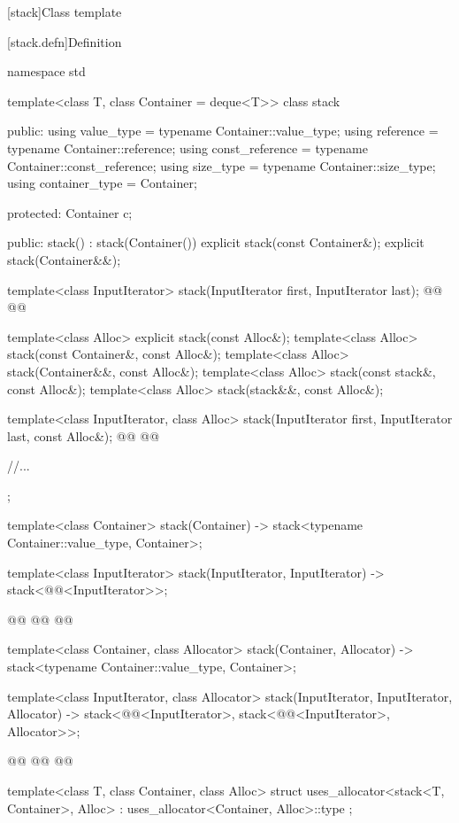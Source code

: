 \documentclass{wg21}
\begin{document}
[stack]{Class template }

[stack.defn]{Definition}

\begin{codeblock}
namespace std {
    template<class T, class Container = deque<T>>
    class stack {
        public:
        using value_type      = typename Container::value_type;
        using reference       = typename Container::reference;
        using const_reference = typename Container::const_reference;
        using size_type       = typename Container::size_type;
        using container_type  = Container;

        protected:
        Container c;

        public:
        stack() : stack(Container()) {}
        explicit stack(const Container&);
        explicit stack(Container&&);

        template<class InputIterator>
        stack(InputIterator first, InputIterator last);
        @@
        @@

        template<class Alloc> explicit stack(const Alloc&);
        template<class Alloc> stack(const Container&, const Alloc&);
        template<class Alloc> stack(Container&&, const Alloc&);
        template<class Alloc> stack(const stack&, const Alloc&);
        template<class Alloc> stack(stack&&, const Alloc&);


        template<class InputIterator, class Alloc>
        stack(InputIterator first, InputIterator last, const Alloc&);
        @@
        @@

        //...
    };

    template<class Container>
    stack(Container) -> stack<typename Container::value_type, Container>;

    template<class InputIterator>
    stack(InputIterator, InputIterator)
    -> stack<@@<InputIterator>>;

    @@
    @@
    @@

    template<class Container, class Allocator>
    stack(Container, Allocator) -> stack<typename Container::value_type, Container>;

    template<class InputIterator, class Allocator>
    stack(InputIterator, InputIterator, Allocator)
    -> stack<@@<InputIterator>,
    stack<@@<InputIterator>, Allocator>>;

    @@
    @@
    @@


    template<class T, class Container, class Alloc>
    struct uses_allocator<stack<T, Container>, Alloc>
    : uses_allocator<Container, Alloc>::type { };
}
\end{codeblock}
\end{document}
